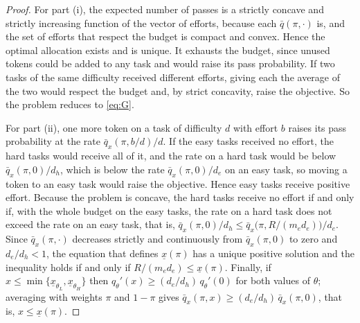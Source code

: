 \documentclass[11pt]{article}
\theoremstyle{definition}
\begin{document}
\begin{proof}
For part (i), the expected number of passes is a strictly concave and strictly increasing function of the vector of efforts, because each $\bar q(\pi,\cdot)$ is, and the set of efforts that respect the budget is compact and convex. Hence the optimal allocation exists and is unique. It exhausts the budget, since unused tokens could be added to any task and would raise its pass probability. If two tasks of the same difficulty received different efforts, giving each the average of the two would respect the budget and, by strict concavity, raise the objective. So the problem reduces to \eqref{eq:G}.

For part (ii), one more token on a task of difficulty $d$ with effort $b$ raises its pass probability at the rate $\bar q_x(\pi,b/d)/d$. If the easy tasks received no effort, the hard tasks would receive all of it, and the rate on a hard task would be below $\bar q_x(\pi,0)/d_h$, which is below the rate $\bar q_x(\pi,0)/d_e$ on an easy task, so moving a token to an easy task would raise the objective. Hence easy tasks receive positive effort. Because the problem is concave, the hard tasks receive no effort if and only if, with the whole budget on the easy tasks, the rate on a hard task does not exceed the rate on an easy task, that is, $\bar q_x(\pi,0)/d_h\le\bar q_x\bigl(\pi,R/(m_e d_e)\bigr)/d_e$. Since $\bar q_x(\pi,\cdot)$ decreases strictly and continuously from $\bar q_x(\pi,0)$ to zero and $d_e/d_h<1$, the equation that defines $\underline x(\pi)$ has a unique positive solution and the inequality holds if and only if $R/(m_e d_e)\le\underline x(\pi)$. Finally, if $x\le\min\{\underline x_{\theta_L},\underline x_{\theta_H}\}$ then $q_\theta'(x)\ge(d_e/d_h)\,q_\theta'(0)$ for both values of $\theta$; averaging with weights $\pi$ and $1-\pi$ gives $\bar q_x(\pi,x)\ge(d_e/d_h)\,\bar q_x(\pi,0)$, that is, $x\le\underline x(\pi)$.


\end{proof}
\end{document}
